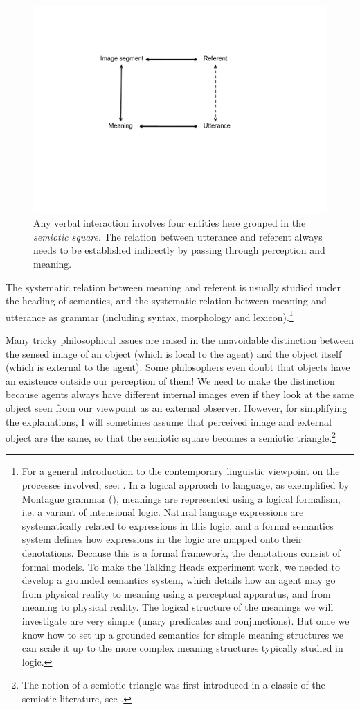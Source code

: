 \begin{figure}[htbp]
  \centerline{\includegraphics[width=.65\textwidth]{chap2/figs/triangle.pdf}}
\caption{\label{triangle}Any verbal interaction
involves four entities here grouped in the
{\it semiotic square}. The relation between utterance
and referent always needs to be established indirectly by 
passing through perception and meaning.}
\end{figure}

The systematic relation between meaning and referent is 
usually studied under the heading of semantics, and the 
systematic relation between meaning and utterance as
grammar (including syntax, morphology and lexicon).\footnote{
For a general introduction to the contemporary linguistic
viewpoint on the processes involved, see: \cite{Vanvalin:1997}. 
In a logical approach to language, as 
exemplified by Montague grammar (\citealt{Montague:1974}),  
meanings are represented using a logical formalism, i.e.
a variant of intensional logic. 
Natural language expressions are systematically 
related to expressions in this logic, and a
formal semantics system defines how expressions in the logic
are mapped onto their denotations. Because this is 
a formal framework, the denotations consist of formal 
models. To make the Talking Heads experiment work, 
we needed to develop a grounded semantics system, which details
how an agent may go from physical reality to meaning
using a perceptual apparatus, and from meaning 
to physical reality. The logical structure of 
the meanings we will investigate are very simple 
(unary predicates and conjunctions). But once we know how to 
set up a grounded semantics for simple meaning
structures we can scale it up to the more complex meaning
structures typically studied in logic.}

Many tricky philosophical issues are raised in 
the unavoidable distinction between the sensed image
of an object (which is local to the agent)
and the object itself (which is external to the 
agent). Some philosophers even doubt that objects 
have an existence outside our perception of them! 
We need to make the distinction because agents always
have different internal images even if they look at 
the same object seen from our viewpoint as an external
observer. However, for simplifying the 
explanations, I will sometimes assume that perceived
image and external object are the same, so that the 
semiotic square becomes a semiotic triangle.\footnote{
The notion of a semiotic triangle was first
introduced in a classic of the semiotic literature, 
see \cite{Ogden:1935}.}

